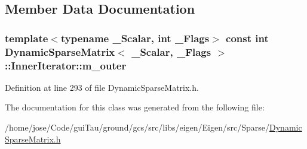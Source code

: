 \subsection{Member Data Documentation}
\hypertarget{class_dynamic_sparse_matrix_1_1_inner_iterator_a3da12fec5adb39892595db0e17bbe705}{
\subsubsection[{m\-\_\-outer}]{\setlength{\rightskip}{0pt plus 5cm}template$<$typename \-\_\-\-Scalar, int \-\_\-\-Flags$>$ const {\bf int} {\bf Dynamic\-Sparse\-Matrix}$<$ \-\_\-\-Scalar, \-\_\-\-Flags $>$\-::Inner\-Iterator\-::m\-\_\-outer\hspace{0.3cm}{\ttfamily [protected]}}}\label{class_dynamic_sparse_matrix_1_1_inner_iterator_a3da12fec5adb39892595db0e17bbe705}


Definition at line 293 of file Dynamic\-Sparse\-Matrix.\-h.



The documentation for this class was generated from the following file\-:\begin{DoxyCompactItemize}
\item 
/home/jose/\-Code/gui\-Tau/ground/gcs/src/libs/eigen/\-Eigen/src/\-Sparse/\hyperlink{_dynamic_sparse_matrix_8h}{Dynamic\-Sparse\-Matrix.\-h}\end{DoxyCompactItemize}
